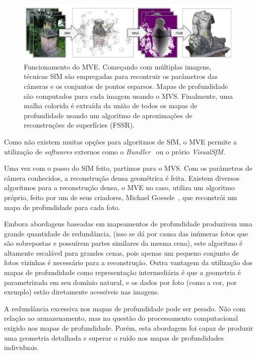 \begin{figure}[!h]
	\centering
	\includegraphics[width=1\linewidth]{figs/mvepipe.png}
	\caption{%
	Funcionamento do MVE. Começando com múltiplas imagens, técnicas SfM são empregadas para recontruir os parâmetros das câmeras e os conjuntos de pontos esparsos. Mapas de profundidade são computados para cada imagem usando o MVS. Finalmente, uma malha colorida é extraída da união de todos os mapas de profundidade usando um algoritmo de aproximações de reconstruções de superfícies (FSSR).
	\cite{mve}
	}\label{fig:mvepipeline}
\end{figure}

Como não existem muitas opções para algoritmos de SfM, o MVE permite a utilização de \emph{softwares} externos como o \emph{Bundler}~\cite{snavely2010bundler} ou o prório \emph{VisualSfM}.

Uma vez com o passo do SfM feito, partimos para o MVS. Com os parâmetros de câmera conhecidos, a reconstrução densa geométrica é feita. Existem diversos algoritmos para a reconstrução densa, o MVE no caso, utiliza um algoritmo próprio, feito por um de seus criadores, Michael Goesele~\cite{goesele2007multi}, que reconstrói um mapa de profundidade para cada foto. 

Embora abordagens baseadas em mapeamentos de profundidade produzirem uma grande quantidade de redundância, (isso se dá por causa das inúmeras fotos que são sobrepostas e possuírem partes similares da mesma cena), este algoritmo é altamente escalável para grandes cenas, pois apenas um pequeno conjunto de fotos vizinhas é necessário para a reconstrução. Outra vantagem da utilização dos mapas de profundidade como representação intermediária é que a geometria é parametrizada em seu domínio natural, e os dados por foto (como a cor, por exemplo) estão diretamente acessíveis nas imagens.

A redundância excessiva nos mapas de profundidade pode ser pesado. Não com relação ao armazenamento, mas na questão do processamento computacional exigido nos mapas de profundidade. Porém, esta abordagem foi capaz de produzir uma geometria detalhada e superar o ruído nos mapas de profundidades individuais.

